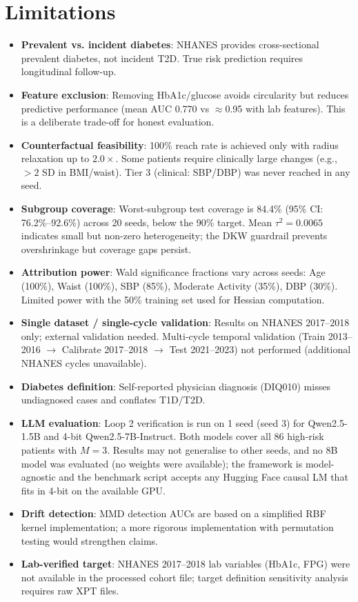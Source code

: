 \documentclass[11pt,a4paper]{article}
\theoremstyle{plain}
\begin{document}
\section{Limitations}
\label{sec:limitations}

\begin{itemize}
    \item \textbf{Prevalent vs. incident diabetes}: NHANES provides cross-sectional prevalent diabetes, not incident T2D. True risk prediction requires longitudinal follow-up.
    \item \textbf{Feature exclusion}: Removing HbA1c/glucose avoids circularity but reduces predictive performance (mean AUC 0.770 vs $\approx$0.95 with lab features). This is a deliberate trade-off for honest evaluation.
    \item \textbf{Counterfactual feasibility}: 100\% reach rate is achieved only with radius relaxation up to $2.0\times$. Some patients require clinically large changes (e.g., $>2$ SD in BMI/waist). Tier 3 (clinical: SBP/DBP) was never reached in any seed.
    \item \textbf{Subgroup coverage}: Worst-subgroup test coverage is 84.4\% (95\% CI: 76.2\%--92.6\%) across 20 seeds, below the 90\% target. Mean $\tau^2 = 0.0065$ indicates small but non-zero heterogeneity; the DKW guardrail prevents overshrinkage but coverage gaps persist.
    \item \textbf{Attribution power}: Wald significance fractions vary across seeds: Age (100\%), Waist (100\%), SBP (85\%), Moderate Activity (35\%), DBP (30\%). Limited power with the 50\% training set used for Hessian computation.
    \item \textbf{Single dataset / single-cycle validation}: Results on NHANES 2017--2018 only; external validation needed. Multi-cycle temporal validation (Train 2013--2016 $\to$ Calibrate 2017--2018 $\to$ Test 2021--2023) not performed (additional NHANES cycles unavailable).
    \item \textbf{Diabetes definition}: Self-reported physician diagnosis (DIQ010) misses undiagnosed cases and conflates T1D/T2D.
\item \textbf{LLM evaluation}: Loop 2 verification is run on 1 seed (seed 3) for Qwen2.5-1.5B and 4-bit Qwen2.5-7B-Instruct. Both models cover all 86 high-risk patients with $M=3$. Results may not generalise to other seeds, and no 8B model was evaluated (no weights were available); the framework is model-agnostic and the benchmark script accepts any Hugging Face causal LM that fits in 4-bit on the available GPU.
    \item \textbf{Drift detection}: MMD detection AUCs are based on a simplified RBF kernel implementation; a more rigorous implementation with permutation testing would strengthen claims.
    \item \textbf{Lab-verified target}: NHANES 2017--2018 lab variables (HbA1c, FPG) were not available in the processed cohort file; target definition sensitivity analysis requires raw XPT files.
\end{itemize}
\end{document}
